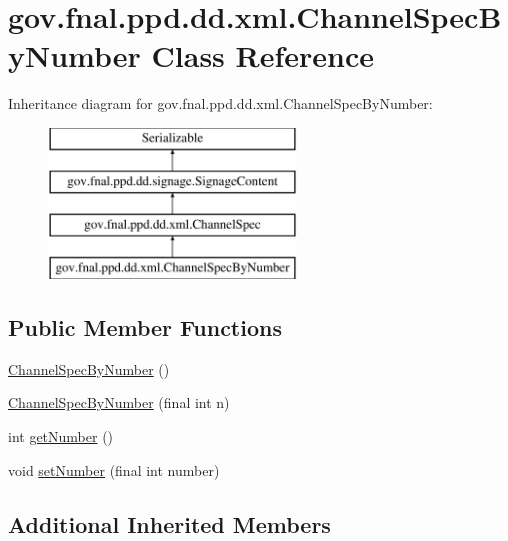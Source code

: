 \hypertarget{classgov_1_1fnal_1_1ppd_1_1dd_1_1xml_1_1ChannelSpecByNumber}{\section{gov.\-fnal.\-ppd.\-dd.\-xml.\-Channel\-Spec\-By\-Number Class Reference}
\label{classgov_1_1fnal_1_1ppd_1_1dd_1_1xml_1_1ChannelSpecByNumber}
}
Inheritance diagram for gov.\-fnal.\-ppd.\-dd.\-xml.\-Channel\-Spec\-By\-Number\-:\begin{figure}[H]
\begin{center}
\leavevmode
\includegraphics[height=4.000000cm]{classgov_1_1fnal_1_1ppd_1_1dd_1_1xml_1_1ChannelSpecByNumber}
\end{center}
\end{figure}
\subsection*{Public Member Functions}
\begin{DoxyCompactItemize}
\item 
\hyperlink{classgov_1_1fnal_1_1ppd_1_1dd_1_1xml_1_1ChannelSpecByNumber_ac3c84eea796719655257be7356a65e5b}{Channel\-Spec\-By\-Number} ()
\item 
\hyperlink{classgov_1_1fnal_1_1ppd_1_1dd_1_1xml_1_1ChannelSpecByNumber_ac165be7f17b3d006e49e48766b908abb}{Channel\-Spec\-By\-Number} (final int n)
\item 
int \hyperlink{classgov_1_1fnal_1_1ppd_1_1dd_1_1xml_1_1ChannelSpecByNumber_a48ec6af06f26b88ca832af86472c3588}{get\-Number} ()
\item 
void \hyperlink{classgov_1_1fnal_1_1ppd_1_1dd_1_1xml_1_1ChannelSpecByNumber_a8a1b1699955fa0a62de6e20ca1549445}{set\-Number} (final int number)
\end{DoxyCompactItemize}
\subsection*{Additional Inherited Members}


